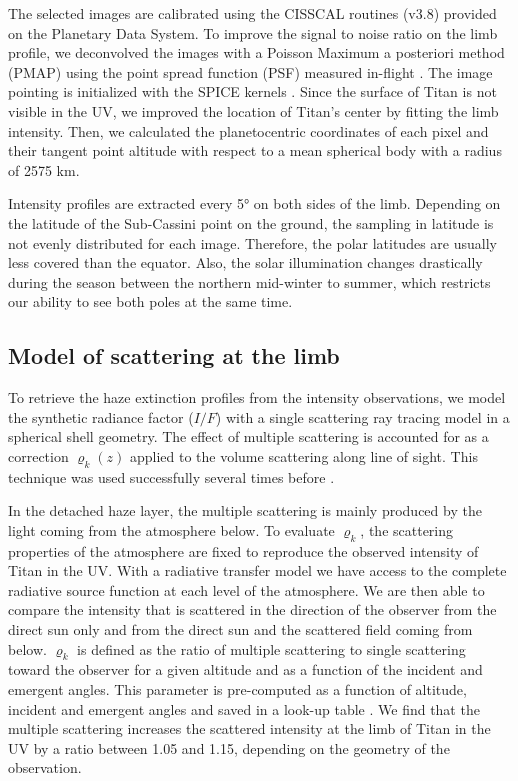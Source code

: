 The selected images are calibrated using the CISSCAL routines (v3.8) provided on the Planetary Data System. To improve
the signal to noise ratio on the limb profile, we deconvolved the images with a Poisson Maximum a posteriori method
(PMAP) using the point spread function (PSF) measured in-flight \citep{West2010}. The image pointing is
initialized with the SPICE kernels \citep{Acton1996, Annex2017}. Since the surface of Titan is not visible in the UV, we improved
the location of Titan's center by fitting the limb intensity. Then, we calculated the planetocentric coordinates of each
pixel and their tangent point altitude with respect to a mean spherical body with a radius of 2575 km.

Intensity profiles are extracted every \ang{5} on both sides of the limb. Depending on the
latitude of the Sub-Cassini point on the ground, the sampling in latitude is not evenly distributed for each image.
Therefore, the polar latitudes are usually less covered than the equator.
Also, the solar illumination changes drastically during the
season between the northern mid-winter to summer, which restricts our ability to see both poles at the same time.


\subsection{Model of scattering at the limb}

To retrieve the haze extinction profiles from the intensity observations, we model the synthetic
radiance factor ($I/F$) with a single scattering ray tracing model in a spherical shell geometry.
The effect of multiple scattering is accounted for as a correction  $\varrho_k\left(z\right)$
applied to the volume scattering along line of sight.
This technique was used successfully several times before \citep[e.g.][]{Rages1983, Rannou1997, Seignovert2017, West2018}.

In the detached haze layer, the multiple scattering is mainly produced by the light coming from the atmosphere below. To
evaluate $\varrho_k$, the scattering properties of the atmosphere are fixed to
reproduce the observed intensity of Titan in the UV. With a radiative transfer model \citep[SHDOMPP, from ][]{Evans1998}
we have access to the complete radiative source function at each level of the atmosphere. We are then able to compare the
intensity that is scattered in the direction of the observer from the direct sun only and from the direct sun and the scattered
field coming from below. $\varrho_k$ is defined as the ratio of multiple scattering to single scattering toward the observer
for a given altitude and as a function of the incident and emergent angles. This parameter is pre-computed as a function of
altitude, incident and emergent angles and saved in a look-up table \citep[see.][for details]{West2018}.
We find that the multiple scattering increases the scattered intensity at the limb of Titan in the UV by a ratio between
1.05 and 1.15, depending on the geometry of the observation.

